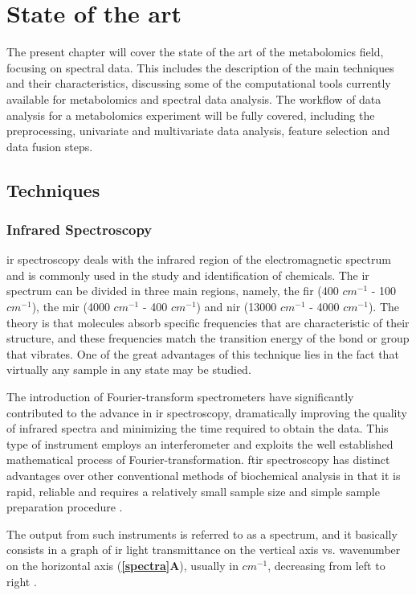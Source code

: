 
\chapter{State of the art}

The present chapter will cover the state of the art of the metabolomics field, focusing on spectral data. This includes the description of the main techniques and their characteristics, discussing some of the computational tools currently available for metabolomics and spectral data analysis. The workflow of data analysis for a metabolomics experiment will be fully covered, including the preprocessing, univariate and multivariate data analysis, feature selection and data fusion steps.


\section{Techniques}

\subsection{Infrared Spectroscopy}

\acrfull{ir} spectroscopy deals with the infrared region of the electromagnetic spectrum and is commonly used in the study and identification of chemicals. The \gls{ir} spectrum can be divided in three main regions, namely, the \gls{fir} (400 $ cm^{-1} $ - 100 $ cm^{-1} $), the \gls{mir} (4000 $ cm^{-1} $ - 400 $ cm^{-1} $) and \gls{nir} (13000 $ cm^{-1} $ - 4000 $ cm^{-1} $). The theory is that molecules absorb specific frequencies that are characteristic of their structure, and these frequencies match the transition energy of the bond or group that vibrates. One of the great advantages of this technique lies in the fact that virtually any sample in any state may be studied.

The introduction of Fourier-transform spectrometers have significantly contributed to the advance in \gls{ir} spectroscopy, dramatically improving the quality of infrared spectra and minimizing the time required to obtain the data. This type of instrument employs an interferometer and exploits the well established mathematical process of Fourier-transformation. \gls{ftir} spectroscopy has distinct advantages over other conventional methods of biochemical analysis in that it is rapid, reliable and requires a relatively small sample size and simple sample preparation procedure \citep{kansiz1999fourier}. 

The output from such instruments is referred to as a spectrum, and it basically consists in a graph of \gls{ir} light transmittance on the vertical axis vs. wavenumber on the horizontal axis (\textbf{\autoref{spectra}A}), usually in $ cm^{-1} $, decreasing from left to right \citep{Stuart2004}.

